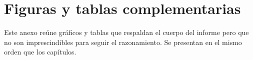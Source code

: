 \section{Figuras y tablas complementarias}
\label{anexo:complementos}
Este anexo reúne gráficos y tablas que respaldan el cuerpo del informe pero que no son
imprescindibles para seguir el razonamiento. Se presentan en el mismo orden que los capítulos.

\clearpage
